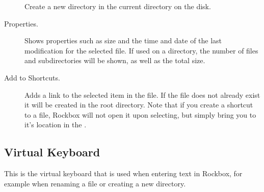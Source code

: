 \begin{description}
  Create a new directory in the current directory on the disk.
\item [Properties.]
  Shows properties such as size and the time and date of the last modification
  for the selected file. If used on a directory, the number of files and
  subdirectories will be shown, as well as the total size.
\item [Add to Shortcuts.]
  Adds a link to the selected item in the  file.
  If the file does not already exist it will be created in the root directory.
  Note that if you create a shortcut to a file, Rockbox will not open it upon
  selecting, but simply bring you to it's location in the .
\end{description}

\subsection{\label{sec:virtual_keyboard}Virtual Keyboard}
This is the virtual keyboard that is used when entering text in Rockbox, for 
example when renaming a file or creating a new directory.


